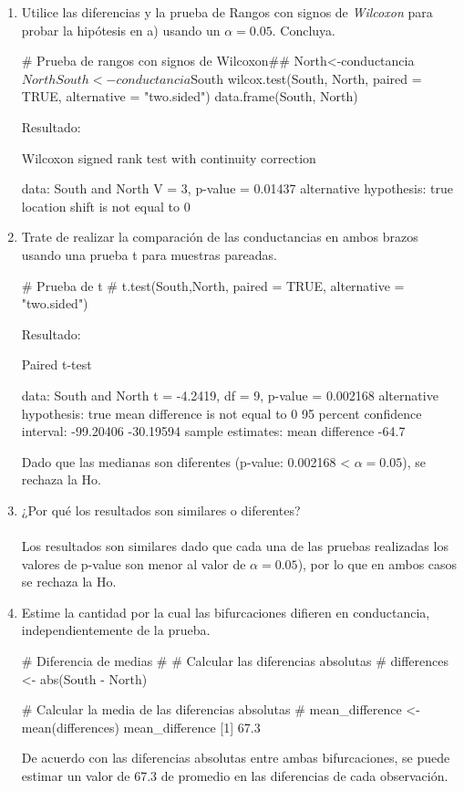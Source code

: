 \documentclass[a4paper,12pt]{article} %
\begin{document}
\begin{enumerate} [label=\textbf{\alph*})]
\begin{MyVerbatim}
\end{MyVerbatim}

\item {Utilice las diferencias y la prueba de Rangos con signos de \textit{Wilcoxon} para probar la hipótesis en a) usando un \( \alpha = 0.05 \). Concluya.}
\begin{MyVerbatim}
	# Prueba de rangos con signos de Wilcoxon##
North<-conductancia$North
South<-conductancia$South
wilcox.test(South, North, paired = TRUE, alternative = "two.sided")
data.frame(South, North)
\end{MyVerbatim}
Resultado:
\begin{MyVerbatim}

	Wilcoxon signed rank test with continuity correction

data:  South and North
V = 3, p-value = 0.01437
alternative hypothesis: true location shift is not equal to 0
\end{MyVerbatim}

\item {Trate de realizar la comparación de las conductancias en ambos brazos usando una prueba t para muestras pareadas.}
\begin{MyVerbatim}
	# Prueba de t #
t.test(South,North, paired = TRUE, alternative = "two.sided")
\end{MyVerbatim}
Resultado:
\begin{MyVerbatim}
	Paired t-test
	
data:  South and North
t = -4.2419, df = 9, p-value = 0.002168
alternative hypothesis: true mean difference is not equal to 0
95 percent confidence interval: -99.20406 -30.19594
sample estimates: mean difference -64.7 
\end{MyVerbatim}
Dado que las medianas son diferentes (p-value: 0.002168 < \( \alpha = 0.05 \)), se rechaza la Ho. 
\item {¿Por qué los resultados son similares o diferentes?}\\
\\
Los resultados son similares dado que cada una de las pruebas realizadas los valores de p-value son menor al valor de \( \alpha = 0.05 \)), por lo que en ambos casos se rechaza la Ho.

\item {Estime la cantidad por la cual las bifurcaciones difieren en conductancia, independientemente de la prueba.}
\begin{MyVerbatim}
	# Diferencia de medias #
# Calcular las diferencias absolutas #
differences <- abs(South - North)
	
# Calcular la media de las diferencias absolutas #
mean_difference <- mean(differences)
mean_difference
[1] 67.3
\end{MyVerbatim}
De acuerdo con las diferencias absolutas entre ambas bifurcaciones, se puede estimar un valor de 67.3 de promedio en las diferencias de cada observación.
	\end{enumerate}
\newpage
\end{document}
